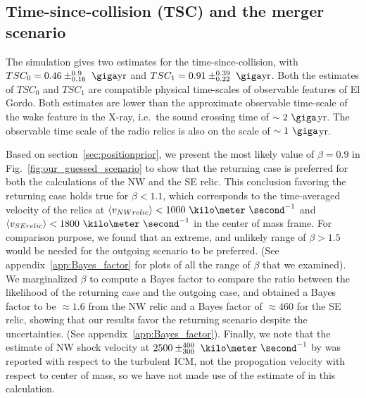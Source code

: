 \subsection{Time-since-collision (TSC) and the merger scenario}
The simulation gives two estimates for
the time-since-collision, with $TSC_0 = 0.46\pm^{0.9}_{0.16}~\giga \text{yr}$
and $TSC_1 =0.91\pm^{0.39}_{0.22}~\giga\text{yr}$. Both the estimates of
$TSC_0$ and $TSC_1$ are compatible physical time-scales of observable
features of El Gordo. Both estimates are lower than the approximate
observable time-scale of the wake feature in the X-ray, i.e.\ the sound
crossing time of $\sim2~\giga$yr. The observable time scale of the radio relics is also on the scale of
$\sim1~\giga$yr.\par 
Based on section~\ref{sec:positionprior}, we present the most likely
value of $\beta = 0.9$ in Fig.~\ref{fig:our_guessed_scenario} to show that
the returning case is preferred for both the calculations of the NW and the
SE relic. This conclusion favoring the returning case holds true for $\beta
< 1.1$, which corresponds to the time-averaged velocity of the relics at
$\langle v_{NW relic} \rangle < 1000~\kilo\meter~\second^{-1}$ and $\langle
v_{SE relic} \rangle < 1800~\kilo\meter~\second^{-1}$ in the center of
mass frame. For comparison purpose, we found that an extreme, and unlikely
range of $\beta > 1.5$ would be needed for the outgoing scenario to be
preferred. (See appendix~\ref{app:Bayes_factor} for plots of all the range
of $\beta$ that we examined). We marginalized $\beta$ to compute a Bayes
factor to compare the ratio between the likelihood of the returning case
and the outgoing case, and obtained a Bayes factor to be $\approx 1.6$ from
the NW relic and a Bayes factor of $\approx 460$ for the SE relic, showing
that our results favor the returning scenario despite the
uncertainties.
(See appendix~\ref{app:Bayes_factor}). Finally, we note that the estimate of NW shock velocity at $2500
\pm^{400}_{300}~\kilo\meter~\second^{-1}$ by \cite{L13} was reported with respect to
the turbulent ICM, not the propogation velocity with respect to center of
mass, so we have not made use of the estimate of \cite{L13} in this
calculation. \par


